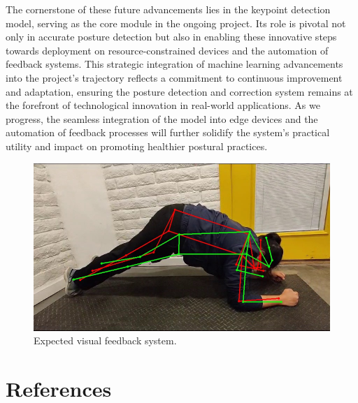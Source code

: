 \documentclass{article}
\begin{document}
The cornerstone of these future advancements lies in the keypoint detection model, serving as the core module in the ongoing project. Its role is pivotal not only in accurate posture detection but also in enabling these innovative steps towards deployment on resource-constrained devices and the automation of feedback systems. This strategic integration of machine learning advancements into the project's trajectory reflects a commitment to continuous improvement and adaptation, ensuring the posture detection and correction system remains at the forefront of technological innovation in real-world applications. As we progress, the seamless integration of the model into edge devices and the automation of feedback processes will further solidify the system's practical utility and impact on promoting healthier postural practices.

\begin{figure}
  \centering
  \includegraphics[width=\textwidth]{inference_img1.jpg}
  \caption{Expected visual feedback system.}
  \label{fig6}
\end{figure}


\section*{References}



\medskip
\end{document}

